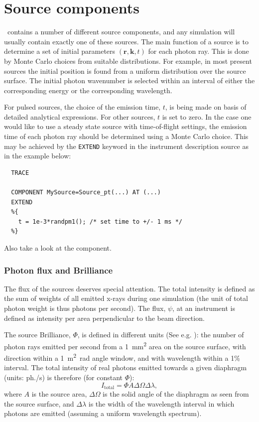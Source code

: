 
\chapter{Source components}
\label{c:source}

\MCX\ contains a number of different source components,
and any simulation will usually contain exactly one of these sources.
The main function of a source is to determine a set of initial
parameters $(\mathbf{r}, \mathbf{k}, t)$
for each photon ray. This is done by Monte Carlo choices from
suitable distributions. For example, in most present sources
the initial position is
found from a uniform distribution over the source surface.
The initial photon wavenumber
is selected within an interval of either the corresponding energy or the corresponding wavelength.

For pulsed sources, the choice of the emission time, $t$,
is being made on basis of detailed analytical expressions.
For other sources, $t$ is set to zero.
In the case one would like to use a steady state source
with time-of-flight settings,
the emission time of each photon ray should be determined using
a Monte Carlo choice. This may be achieved by
the \verb+EXTEND+ keyword in the instrument description source
as in the example below:

\begin{verbatim}
  TRACE

  COMPONENT MySource=Source_pt(...) AT (...)
  EXTEND
  %{
    t = 1e-3*randpm1(); /* set time to +/- 1 ms */
  %}
\end{verbatim}
Also take a look at the  component.

\subsection{Photon flux and Brilliance}
\label{s:xray-flux}
The flux of the sources deserves special attention. The total
intensity is defined as the sum of weights of all emitted x-rays
during one simulation
(the unit of total photon weight is thus photons per second).
The flux, $\psi$, at an instrument is defined as intensity per area perpendicular
to the beam direction.

The source Brilliance, $\Phi$, is defined in different units (See e.g. \cite{als2011elements}):
the number of photon rays emitted per second from a
\SI{1}{\square mm} area on the source surface,
with direction within a 1~\si{\square m \radian} angle window,
and with wavelength within a 1\% interval.
The total intensity of real photons emitted towards a given diaphragm
(units: ph./s) is therefore (for constant $\Phi$):
\begin{equation}
I_\mathrm{total} = \Phi A \Delta\Omega \Delta\lambda ,
\end{equation}
where $A$ is the source area, $\Delta\Omega$ is the solid angle of the
diaphragm as seen from the source surface, and $\Delta\lambda$ is the
width of the wavelength interval in which photons are emitted (assuming
a uniform wavelength spectrum).

